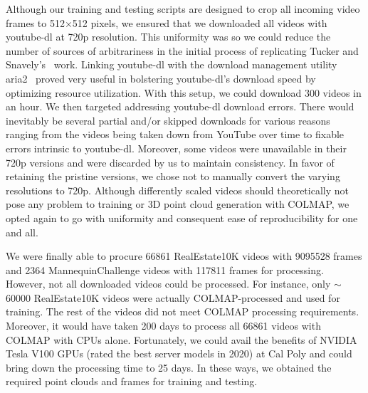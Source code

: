Although our training and testing scripts are designed to crop all incoming video frames to 512$\times$512 pixels, we ensured that we downloaded all videos with youtube-dl at 720p resolution. This uniformity was so we could reduce the number of sources of arbitrariness in the initial process of replicating Tucker and Snavely's~\cite{single_view_mpi} work. Linking youtube-dl with the download management utility aria2~\cite{noauthor_aria2_2021} proved very useful in bolstering youtube-dl’s download speed by optimizing resource utilization. With this setup, we could download 300 videos in an hour. We then targeted addressing youtube-dl download errors. There would inevitably be several partial and/or skipped downloads for various reasons ranging from the videos being taken down from YouTube over time to fixable errors intrinsic to youtube-dl. Moreover, some videos were unavailable in their 720p versions and were discarded by us to maintain consistency. In favor of retaining the pristine versions, we chose not to manually convert the varying resolutions to 720p. Although differently scaled videos should theoretically not pose any problem to training or 3D point cloud generation with COLMAP, we opted again to go with uniformity and consequent ease of reproducibility for one and all.
    
We were finally able to procure 66861 RealEstate10K videos with 9095528 frames and 2364 MannequinChallenge videos with 117811 frames for processing. However, not all downloaded videos could be processed. For instance, only $\sim$60000 RealEstate10K videos were actually COLMAP-processed and used for training. The rest of the videos did not meet COLMAP processing requirements. Moreover, it would have taken 200 days to process all 66861 videos with COLMAP with CPUs alone. Fortunately, we could avail the benefits of NVIDIA Tesla V100 GPUs (rated the best server models in 2020) at Cal Poly and could bring down the processing time to 25 days. In these ways, we obtained the required point clouds and frames for training and testing.















